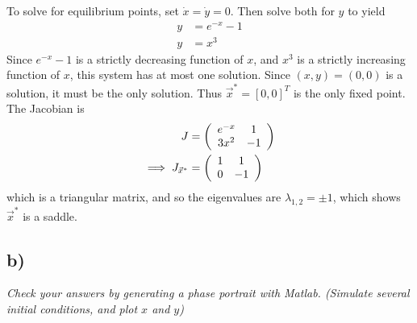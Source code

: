 \documentclass[12pt]{article}
\begin{document}
To solve for equilibrium points, set $\dot{x} = \dot{y} = 0$.  Then solve both for $y$ to yield
\begin{align*}
	y &= e^{-x} - 1 \\
	y &= x^3
\end{align*}
Since $e^{-x} - 1$ is a strictly decreasing function of $x$, and $x^3$ is a strictly increasing function of $x$, this system has at most one solution.  Since $(x,y) = (0,0)$ is a solution, it must be the only solution.  Thus $\vec{x}^* = [0,0]^T$ is the only fixed point.  The Jacobian is
\begin{align*}
	J &= \qty(\begin{array}{cc}
		e^{-x} & 1 \\
		3x^2 & -1
	\end{array}) \\
	\implies J_{\vec{x}^*} &= \qty(\begin{array}{cc}
		1 & 1 \\
		0 & -1
	\end{array})
\end{align*}
which is a triangular matrix, and so the eigenvalues are $\lambda_{1,2} = \pm 1$, which shows $\vec{x}^*$ is a saddle.

\subsection*{ b)}
\emph{Check your answers by generating a phase portrait with Matlab.  (Simulate several initial conditions, and plot $x$ and $y$)}
\end{document}
